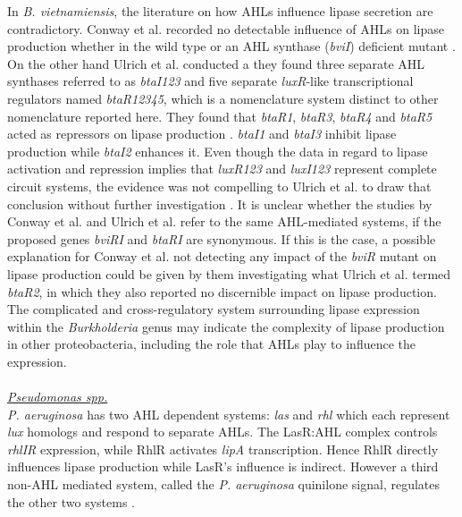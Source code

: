 \documentclass[twoside]{article}
\begin{document}
In \emph{B. vietnamiensis}, the literature on how AHLs influence lipase secretion are contradictory. Conway et al. recorded no detectable influence of AHLs on lipase production whether in the wild type or an AHL synthase (\emph{bviI}) deficient mutant \cite{conway_02}. On the other hand Ulrich et al. conducted a they found three separate AHL synthases referred to as \emph{btaI123} and five separate \emph{luxR}-like transcriptional regulators named \emph{btaR12345}, which is a nomenclature system distinct to other nomenclature reported here. They found that \emph{btaR1}, \emph{btaR3}, \emph{btaR4} and \emph{btaR5} acted as repressors on lipase production \cite{ulrich2004}. \emph{btaI1} and \emph{btaI3} inhibit lipase production while \emph{btaI2} enhances it. Even though the data in regard to lipase activation and repression implies that \emph{luxR123} and \emph{luxI123} represent complete circuit systems, the evidence was not compelling to Ulrich et al. to draw that conclusion without further investigation \cite{ulrich2004}.
It is unclear whether the studies by Conway et al. and Ulrich et al. refer to the same AHL-mediated systems, if the proposed genes \emph{bviRI} and \emph{btaRI} are synonymous. If this is the case, a possible explanation for Conway et al. not detecting any impact of the \emph{bviR} mutant on lipase production could be given by them investigating what Ulrich et al. termed \emph{btaR2}, in which they also reported no discernible impact on lipase production. 
The complicated and cross-regulatory system surrounding lipase expression within the \emph{Burkholderia} genus may indicate the complexity of lipase production in other proteobacteria, including the role that AHLs play to influence the expression.
\\
\\ \emph{\underline{Pseudomonas spp.}}
\\ \emph{P. aeruginosa} has two AHL dependent systems: \emph{las} and \emph{rhl} which each represent \emph{lux} homologs and respond to separate AHLs. The LasR:AHL complex controls \emph{rhlIR} expression, while RhlR activates \emph{lipA} transcription. Hence RhlR directly influences lipase production while LasR's influence is indirect. However a third non-AHL mediated system, called the \emph{P. aeruginosa} quinilone signal, regulates the other two systems \cite{juhas2005}. 
\end{document}
